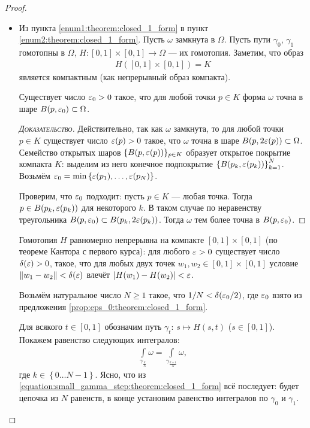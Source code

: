 \begin{proof}\
 \begin{itemize}
  \item Из пункта \ref{enum1:theorem:closed_1_form} в пункт \ref{enum2:theorem:closed_1_form}. Пусть $\omega$ замкнута в $\Omega$. Пусть пути $\gamma_0$, $\gamma_1$ гомотопны в $\Omega$, $H \colon [0,1] \times [0,1] \to \Omega$ --- их гомотопия. Заметим, что образ
   \begin{align*}
    H([0,1] \times [0,1]) = K
   \end{align*}  является компактным (как непрерывный образ компакта).
   \begin{prop}
    \label{prop:eps_0:theorem:closed_1_form}
    Существует число $\varepsilon_0 > 0$ такое, что для любой точки $p \in K$ форма $\omega$ точна в шаре $B(p,\varepsilon_0) \subset \Omega$. 
   \end{prop}
   \begin{proof}[\normalfont\textsc{Доказательство}]
    Действительно, так как $\omega$ замкнута, то для любой точки $p \in K$ существует число $\varepsilon(p) > 0$ такое, что $\omega$ точна в шаре $B(p,2\varepsilon(p))\subset\Omega$. Семейство открытых шаров $\{B(p,\varepsilon(p))\}_{p \in K}$ образует открытое покрытие компакта $K$:  выделим из него конечное подпокрытие $\left\{ B(p_k, \varepsilon(p_k)) \right\}_{k=1}^{N}$. Возьмём $\varepsilon_0 = \min \left\{ \varepsilon(p_1), \ldots, \varepsilon(p_N) \right\}$.

    Проверим, что $\varepsilon_0$ подходит: пусть $p \in K$ --- любая точка. Тогда $p \in B(p_k,\varepsilon(p_k))$ для некоторого $k$. В таком случае по неравенству треугольника $B(p, \varepsilon_0)\subset B(p_k,2\varepsilon(p_k))$. Тогда $\omega$ тем более точна в $B(p,\varepsilon_0)$.
   \end{proof}

   Гомотопия $H$ равномерно непрерывна на компакте $[0,1]\times[0,1]$ (по теореме Кантора с первого курса): для любого $\varepsilon > 0$ существует число $\delta(\varepsilon) > 0$, такое, что для любых двух точек $w_1,w_2 \in [0,1] \times [0,1]$ условие $\left\| w_1 - w_2 \right\| < \delta(\varepsilon)$ влечёт $\left| H(w_1)-H(w_2) \right| < \varepsilon$.

   Возьмём натуральное число $N \geqslant 1$ такое, что $1 / N < \delta(\varepsilon_0 / 2)$, где $\varepsilon_0$ взято из предложения \ref{prop:eps_0:theorem:closed_1_form}.

   Для всякого $t \in [0,1]$ обозначим путь $\gamma_t \colon\, s \mapsto H(s,t)$ ($s \in [0,1]$). Покажем равенство следующих интегралов:
   \begin{align}
    \label{equation:small_gamma_step:theorem:closed_1_form}
    \int\limits_{\gamma_{\frac{k}{N}}}  \omega = \int\limits_{\gamma_{\frac{k+1}{N}}}  \omega,
   \end{align} где $k \in \left\{ 0 \ldots N - 1 \right\}$. Ясно, что из \eqref{equation:small_gamma_step:theorem:closed_1_form} всё последует: будет цепочка из $N$ равенств, в конце установим равенство интегралов по $\gamma_0$ и $\gamma_1$.


\end{itemize}
\end{proof}
